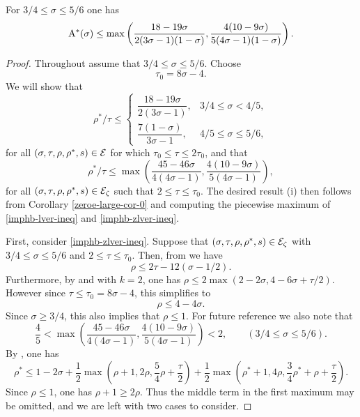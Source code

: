 \begin{theorem}\label{imp-hb-energy-bound}
For $3/4 \le \sigma \le 5/6$ one has
\[
\mathrm{A}^*(\sigma) \le \max\left(\frac{18 - 19\sigma}{2(3\sigma - 1)(1-\sigma)}, \frac{4(10 - 9\sigma)}{5(4\sigma - 1)(1 - \sigma)}\right).
\]
\end{theorem}

\derived
{}

\begin{proof} Throughout assume that $3/4 \le \sigma \le 5/6$. Choose
\[
\tau_0 = 8\sigma - 4.
\]
We will show that
\begin{equation}\label{imphb-lver-ineq}
\rho^*/\tau \le \begin{cases}
\dfrac{18 - 19\sigma}{2(3\sigma - 1)},&3/4 \le \sigma < 4/5,\\
\dfrac{7(1 - \sigma)}{3\sigma - 1},&4/5 \le \sigma \le 5/6,
\end{cases}
\end{equation}
for all $(\sigma, \tau, \rho, \rho^*, s) \in \mathcal{E}$ for which $\tau_0 \le \tau \le 2\tau_0$, and that
\begin{equation}\label{imphb-zlver-ineq}
\rho^*/\tau \le \max\left(\frac{45 - 46\sigma}{4(4\sigma - 1)}, \frac{4(10 - 9\sigma)}{5(4\sigma - 1)}\right),
\end{equation}
for all $(\sigma, \tau, \rho, \rho^*, s) \in \mathcal{E}_\zeta$ such that $2 \le \tau \le \tau_0$. The desired result (i) then follows from Corollary \ref{zeroe-large-cor-0} and computing the piecewise maximum of \eqref{imphb-lver-ineq} and \eqref{imphb-zlver-ineq}.

First, consider \eqref{imphb-zlver-ineq}. Suppose that $(\sigma, \tau, \rho, \rho^*, s)\in \mathcal{E}_\zeta$ with $3/4 \le \sigma \le 5/6$ and $2 \le \tau \le \tau_0$. Then, from  we have
\begin{equation}\label{hb-lv-rho-form}
\rho \le 2\tau - 12(\sigma - 1/2).
\end{equation}
Furthermore, by  and  with $k = 2$, one has $\rho \le 2\max(2 - 2\sigma, 4 - 6\sigma + \tau/2)$. However since $\tau \le \tau_0 = 8\sigma - 4$, this simplifies to
\begin{equation}
\label{huxley-lv-rho-form2}
\rho \le 4 - 4\sigma.
\end{equation}
Since $\sigma \ge 3/4$, this also implies that $\rho \le 1$. For future reference we also note that
\begin{equation}\label{zlver:tau-gradient-1}
\frac{4}{5} < \max\left(\frac{45 - 46\sigma}{4(4\sigma - 1)}, \frac{4(10 - 9\sigma)}{5(4\sigma - 1)}\right) < 2,\qquad (3/4 \le \sigma \le 5/6).
\end{equation}
By , one has
\[
\rho^* \leq 1-2\sigma + \frac{1}{2}\max\left(\rho+1, 2\rho, \frac{5}{4}\rho+\frac{\tau}{2}\right) + \frac{1}{2}\max\left(\rho^*+1, 4\rho, \frac{3}{4}\rho^*+\rho+\frac{\tau}{2}\right).
\]
Since $\rho \le 1$, one has $\rho + 1 \ge 2\rho$. Thus the middle term in the first maximum may be omitted, and we are left with two cases to consider.


\end{proof}

